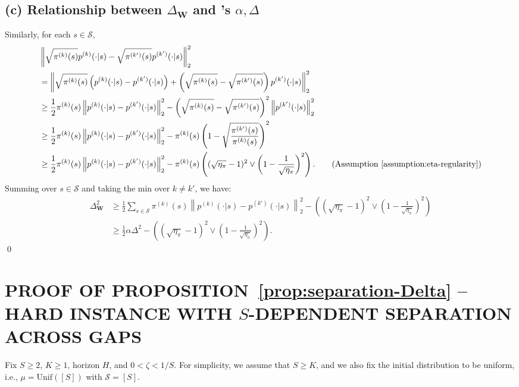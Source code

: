 \documentclass[twoside]{article}
\def\mW{{\bm{W}}}
\def\gS{{\mathcal{S}}}
\theoremstyle{plain}
\def\bignorm#1{\left\lVert #1 \right\rVert}
\newcommand{\Unif}{\mathrm{Unif}}
\begin{document}
\subsection{\texorpdfstring{(c) Relationship between $\Delta_{\mathbf{W}}$ and \citet{kausik2023mixture}'s $\alpha, \Delta$}{(c) Relationship between our and Kausik et al. (2023)'s L2-based Separations}}
Similarly, for each $s \in \gS,$
\begin{align*}
        &\bignorm{\sqrt{\pi^{(k)}(s)} p^{(k)}(\cdot | s) - \sqrt{\pi^{(k')}(s)} p^{(k')}(\cdot | s)}_2^2 \\
        &= \bignorm{\sqrt{\pi^{(k)}(s)} \left( p^{(k)}(\cdot | s) - p^{(k')}(\cdot | s) \right) + \left(\sqrt{\pi^{(k)}(s)} - \sqrt{\pi^{(k')}(s)}\right) p^{(k')}(\cdot | s)}_2^2 \\
        &\geq \frac{1}{2} \pi^{(k)}(s) \bignorm{p^{(k)}(\cdot | s) - p^{(k')}(\cdot | s)}_2^2 - \left( \sqrt{\pi^{(k)}(s)} - \sqrt{\pi^{(k')}(s)} \right)^2 \bignorm{p^{(k')}(\cdot | s)}_2^2 \\
        &\geq \frac{1}{2} \pi^{(k)}(s) \bignorm{p^{(k)}(\cdot | s) - p^{(k')}(\cdot | s)}_2^2 - \pi^{(k)}(s) \left( 1 - \sqrt{\frac{\pi^{(k')}(s)}{\pi^{(k)}(s)}} \right)^2 \\
        &\geq \frac{1}{2} \pi^{(k)}(s) \bignorm{p^{(k)}(\cdot | s) - p^{(k')}(\cdot | s)}_2^2 - \pi^{(k)}(s) \left( (\sqrt{\eta_\pi} - 1)^2 \vee \left( 1 - \frac{1}{\sqrt{\eta_\pi}} \right)^2 \right). \tag{Assumption~\ref{assumption:eta-regularity}}
    \end{align*}
    Summing over $s \in \gS$ and taking the min over $k \neq k'$, we have:
    \begin{align}
        \Delta_\mW^2 &\geq \frac{1}{2} \sum_{s \in \gS} \pi^{(k)}(s) \bignorm{p^{(k)}(\cdot | s) - p^{(k')}(\cdot | s)}_2^2 - \left( (\sqrt{\eta_\pi} - 1)^2 \vee \left( 1 - \frac{1}{\sqrt{\eta_\pi}} \right)^2 \right) \nonumber \\
        &\geq \frac{1}{2} \alpha \Delta^2 - \left( (\sqrt{\eta_\pi} - 1)^2 \vee \left( 1 - \frac{1}{\sqrt{\eta_\pi}} \right)^2 \right).
    \end{align}
    \qed

\newpage
\section{\texorpdfstring{PROOF OF PROPOSITION~\ref{prop:separation-Delta} -- HARD INSTANCE WITH $S$-DEPENDENT SEPARATION ACROSS GAPS}{PROOF OF PROPOSITION 5.2 -- HARD INSTANCE WITH S-DEPENDENT SEPARATION ACROSS GAPS}}
\label{app:gaps2}
Fix $S\ge2$, $K\ge1$, horizon $H$, and $0 < \zeta < 1/S$.
For simplicity, we assume that $S \geq K$, and we also fix the initial distribution to be uniform, i.e., $\mu = \Unif([S])$ with $\gS = [S]$.
\end{document}
